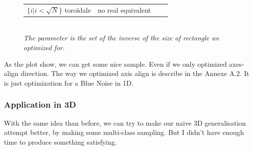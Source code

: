\documentclass{classeENS}
\begin{document}
\begin{figure}[H]
\begin{tabular}{|C{5cm}|C{2.5cm}||C{3cm}|L{3cm}|}
        \tabularnewline
        \hline 
            $\{i | i < \sqrt N \}$ toroïdale & 
            no real equivalent &
             & 
    \tabularnewline
    \hline 
        \end{tabular}\\

        \textit{The parameter is the set of the inverse of the size of rectangle
        we optimized for.}
    \end{figure}
    
    \> As the plot show, we can get some nice sample. Even if we only optimized
    axes-align direction. The way we optimized axis align is describe in the 
    Annexe A.2. It is just optimization for a Blue Noise in 1D.

\subsubsection{Application in 3D}
    With the same idea than before, we can try to make our naive 3D generalisation attempt
    better, by making some multi-class sampling. But I didn't have enough time to produce
    something satisfying.
\end{document}
